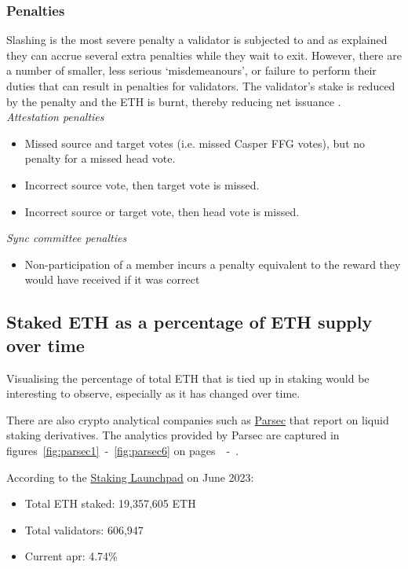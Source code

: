 \documentclass[UTF8]{article}
\begin{document}
\subsubsection*{Penalties}
Slashing is the most severe penalty a validator is subjected to and as explained they can accrue several extra penalties while they wait to exit. However, there are a number of smaller, less serious `misdemeanours', or failure to perform their duties that can result in penalties for validators. The validator's stake is reduced by the penalty and the ETH is burnt, thereby reducing net issuance \cite{Edgington2023}. \\

\textit{Attestation penalties}
\begin{itemize}
\item Missed source and target votes (i.e. missed Casper FFG votes), but no penalty for a missed head vote.
\item Incorrect source vote, then target vote is missed.
\item Incorrect source or target vote, then head vote is missed.
\end{itemize}

\textit{Sync committee penalties}
\begin{itemize}
\item Non-participation of a member incurs a penalty equivalent to the reward they would have received if it was correct
\end{itemize}


\subsection{Staked ETH as a percentage of ETH supply over time}
Visualising the percentage of total ETH that is tied up in staking would be interesting to observe, especially as it has changed over time.

There are also crypto analytical companies such as \href{https://parsec.finance/}{Parsec} that report on liquid staking derivatives. The analytics provided by Parsec are captured in figures~\ref{fig:parsec1}~-~\ref{fig:parsec6} on pages~\pageref{fig:parsec1}~-~\pageref{fig:parsec6}.

According to the \href{https://launchpad.ethereum.org/en/}{Staking Launchpad} on June 2023:
\begin{itemize}
\item Total ETH staked: 19,357,605 ETH
\item Total validators: 606,947
\item Current \gls{apr}: 4.74\%
\end{itemize}
\end{document}

